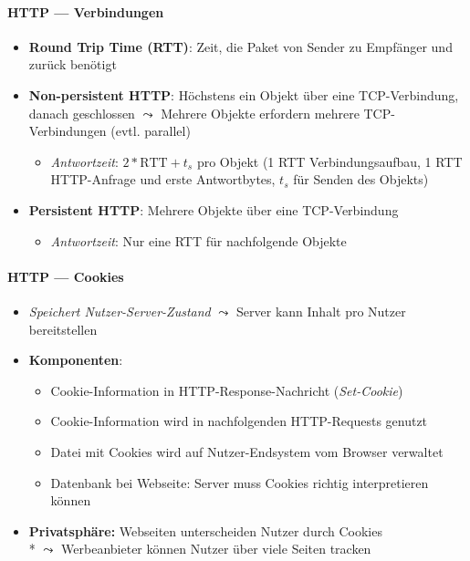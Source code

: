 \paragraph{HTTP --- Verbindungen}
\begin{itemize}
  \item \textbf{Round Trip Time (RTT)}: Zeit, die Paket von Sender zu Empfänger und zurück benötigt
  \item \textbf{Non-persistent HTTP}: Höchstens ein Objekt über eine TCP-Verbindung, danach geschlossen \( \leadsto \) Mehrere Objekte erfordern mehrere TCP-Verbindungen (evtl. parallel)
  \begin{itemize}
    \item \emph{Antwortzeit}: \( 2*\text{RTT} + t_s \) pro Objekt (1 RTT Verbindungsaufbau, 1 RTT HTTP-Anfrage und erste Antwortbytes, \( t_s \) für Senden des Objekts)
  \end{itemize}
  \item \textbf{Persistent HTTP}: Mehrere Objekte über eine TCP-Verbindung
  \begin{itemize}
    \item \emph{Antwortzeit}: Nur eine RTT für nachfolgende Objekte
  \end{itemize}
\end{itemize}

\paragraph{HTTP --- Cookies}
\begin{itemize}
  \item \emph{Speichert Nutzer-Server-Zustand} \( \leadsto \) Server kann Inhalt pro Nutzer bereitstellen
  \item \textbf{Komponenten}:
  \begin{itemize}
    \item Cookie-Information in HTTP-Response-Nachricht (\textit{Set-Cookie})
    \item Cookie-Information wird in nachfolgenden HTTP-Requests genutzt
    \item Datei mit Cookies wird auf Nutzer-Endsystem vom Browser verwaltet
    \item Datenbank bei Webseite: Server muss Cookies richtig interpretieren können
  \end{itemize}
	\item \textbf{Privatsphäre: } Webseiten unterscheiden Nutzer durch Cookies \\*
    	\( \leadsto \) Werbeanbieter können Nutzer über viele Seiten tracken
\end{itemize}

